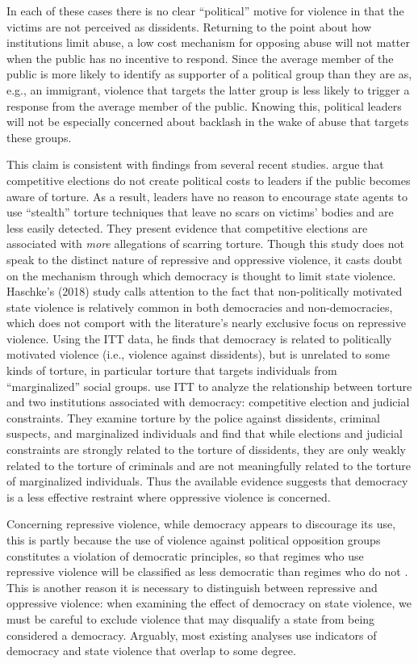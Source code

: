 \documentclass[11pt]{article}
\begin{document}
In each of these cases there is no clear ``political'' motive for violence in that the victims are not perceived as dissidents. Returning to the point about how institutions limit abuse, a low cost mechanism for opposing abuse will not matter when the public has no incentive to respond. Since the average member of the public is more likely to identify as supporter of a political group than they are as, e.g., an immigrant, violence that targets the latter group is less likely to trigger a response from the average member of the public. Knowing this, political leaders will not be especially concerned about backlash in the wake of abuse that targets these groups. 

This claim is consistent with findings from several recent studies. \citet{ConradHillMoore2018} argue that competitive elections do not create political costs to leaders if the public becomes aware of torture. As a result, leaders have no reason to encourage state agents to use ``stealth'' torture techniques that leave no scars on victims' bodies and are less easily detected. They present evidence that competitive elections are associated with {\em more} allegations of scarring torture. Though this study does not speak to the distinct nature of repressive and oppressive violence, it casts doubt on the mechanism through which democracy is thought to limit state violence. Haschke's (2018) study calls attention to the fact that non-politically motivated state violence is relatively common in both democracies and non-democracies, which does not comport with the literature's nearly exclusive focus on repressive violence. Using the ITT data, he finds that democracy is related to politically motivated violence (i.e., violence against dissidents), but is unrelated to some kinds of torture, in particular torture that targets individuals from ``marginalized'' social groups. \citet{JacksonHillHall2018} use ITT to analyze the relationship between torture and two  institutions associated with democracy: competitive election and judicial constraints. They examine torture by the police against dissidents, criminal suspects, and marginalized individuals and find that while elections and judicial constraints are strongly related to the torture of dissidents, they are only weakly related to the torture of criminals and are not meaningfully related to the torture of marginalized individuals. Thus the available evidence suggests that democracy is a less effective restraint where oppressive violence is concerned.       

Concerning repressive violence, while democracy appears to discourage its use, this is partly because the use of violence against political opposition groups constitutes a violation of democratic principles, so that regimes who use repressive violence will be classified as less democratic than regimes who do not \citep{Hill2016}. This is another reason it is necessary to distinguish between repressive and oppressive violence: when examining the effect of democracy on state violence, we must be careful to exclude violence that may disqualify a state from being considered a democracy. Arguably, most existing analyses use indicators of democracy and state violence that overlap to some degree. 
\end{document}
